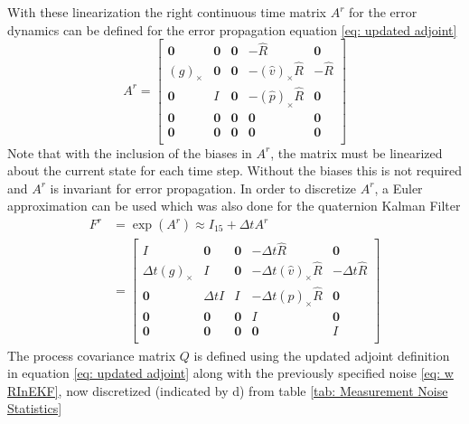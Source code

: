 With these linearization the right continuous time matrix $A^r$ for the error dynamics can be defined for the error propagation equation \eqref{eq: updated adjoint}
\begin{equation}
    A^r = \begin{bmatrix}
        \mathbf{0} & \mathbf{0} & \mathbf{0} & -\hat{R} & \mathbf{0} \\
        (g)_{\times} & \mathbf{0} & \mathbf{0} & -(\hat{v})_{\times} \hat{R} & -\hat{R} \\
        \mathbf{0} & I & \mathbf{0} & -(\hat{p})_{\times} \hat{R} & \mathbf{0} \\
        \mathbf{0} & \mathbf{0} & \mathbf{0} & \mathbf{0} & \mathbf{0} \\
        \mathbf{0} & \mathbf{0} & \mathbf{0} & \mathbf{0} & \mathbf{0} \\
    \end{bmatrix}
    \label{eq: A^r RInEKF}
\end{equation}
Note that with the inclusion of the biases in $A^r$, the matrix must be linearized about the current state for each time step. Without the biases this is not required and $A^r$ is invariant for error propagation. In order to discretize $A^r$, a Euler approximation can be used which was also done for the quaternion Kalman Filter
\begin{equation}
    \begin{split}
        F^r &= \exp(A^r) \approx I_{15} + \Delta t A^r \\
            &= \begin{bmatrix}
            I & \mathbf{0} & \mathbf{0} & -\Delta t \hat{R} & \mathbf{0} \\
            \Delta t (g)_{\times} & I & \mathbf{0} & - \Delta t (\hat{v})_{\times} \hat{R} & -\Delta t \hat{R} \\
            \mathbf{0} & \Delta t I & I & -\Delta t (\hat{p})_{\times} \hat{R} & \mathbf{0} \\
            \mathbf{0} & \mathbf{0} & \mathbf{0} & I & \mathbf{0} \\
            \mathbf{0} & \mathbf{0} & \mathbf{0} & \mathbf{0} & I \\
        \end{bmatrix}
        \label{eq: F^r RInEKF}
    \end{split}
\end{equation}
The process covariance matrix $Q$ is defined using the updated adjoint definition in equation \eqref{eq: updated adjoint} along with the previously specified noise \eqref{eq: w RInEKF}, now discretized (indicated by d) from table \eqref{tab: Measurement Noise Statistics}

